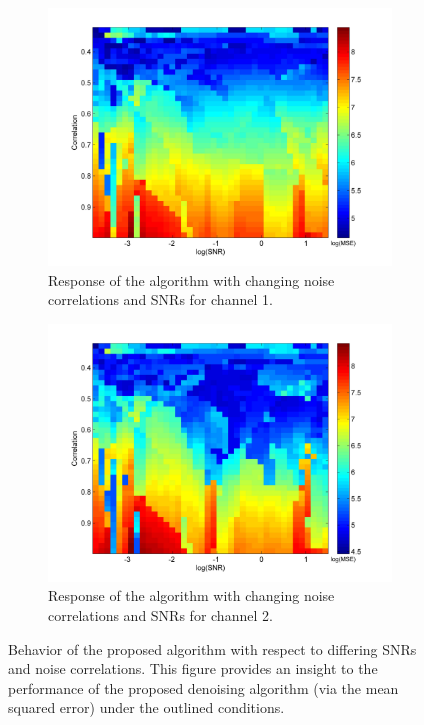\documentclass[onecolumn, groupedaddress, 10pt]{revtex4-1}
\begin{document}
\begin{figure}[ht]
	\centering
	\begin{subfigure}{.5\textwidth}
  		\centering
  		\includegraphics[width=.9\linewidth]{denoise_4.jpg}
  		\caption{\label{fig:denoise_4} Response of the algorithm with changing noise correlations and SNRs for channel 1.}
	\end{subfigure}%
	\begin{subfigure}{.5\textwidth}
  		\centering
  		\includegraphics[width=0.9\linewidth]{denoise_5.jpg}
  		\caption{\label{fig:denoise_5} Response of the algorithm with changing noise correlations and SNRs for channel 2.}
	\end{subfigure}
	\caption{Behavior of the proposed algorithm with respect to differing SNRs and noise correlations. This figure provides an insight to the performance of the proposed denoising algorithm (via the mean squared error) under the outlined conditions.}
\end{figure}
\end{document}
